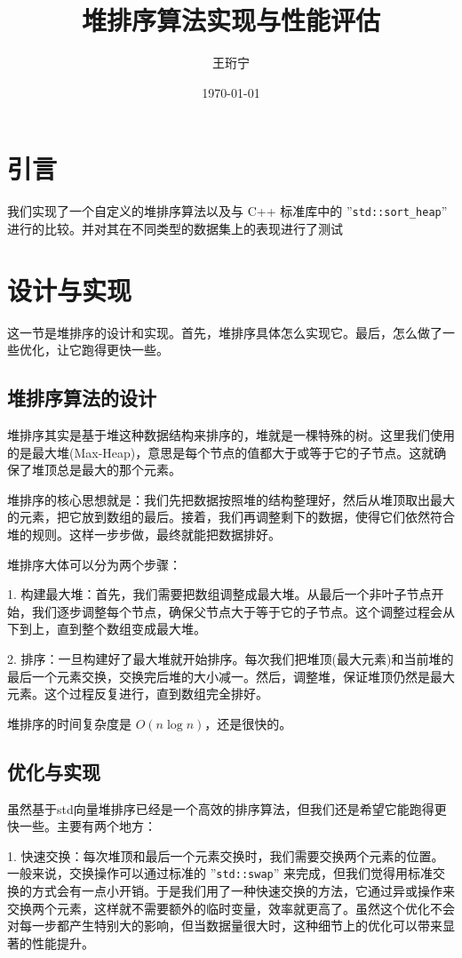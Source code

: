 \documentclass{article}
\title{堆排序算法实现与性能评估}
\author{王珩宁}
\date{\today}
\begin{document}
\maketitle

\section{引言}
我们实现了一个自定义的堆排序算法以及与 C++ 标准库中的 ''\texttt{std::sort\_heap}'' 进行的比较。并对其在不同类型的数据集上的表现进行了测试

\section{设计与实现}
这一节是堆排序的设计和实现。首先，堆排序具体怎么实现它。最后，怎么做了一些优化，让它跑得更快一些。

\subsection{堆排序算法的设计}
堆排序其实是基于堆这种数据结构来排序的，堆就是一棵特殊的树。这里我们使用的是最大堆(Max-Heap)，意思是每个节点的值都大于或等于它的子节点。这就确保了堆顶总是最大的那个元素。

堆排序的核心思想就是：我们先把数据按照堆的结构整理好，然后从堆顶取出最大的元素，把它放到数组的最后。接着，我们再调整剩下的数据，使得它们依然符合堆的规则。这样一步步做，最终就能把数据排好。

堆排序大体可以分为两个步骤：

1. 构建最大堆：首先，我们需要把数组调整成最大堆。从最后一个非叶子节点开始，我们逐步调整每个节点，确保父节点大于等于它的子节点。这个调整过程会从下到上，直到整个数组变成最大堆。
   
2. 排序：一旦构建好了最大堆就开始排序。每次我们把堆顶(最大元素)和当前堆的最后一个元素交换，交换完后堆的大小减一。然后，调整堆，保证堆顶仍然是最大元素。这个过程反复进行，直到数组完全排好。

堆排序的时间复杂度是 $O(n \log n)$，还是很快的。

\subsection{优化与实现}
虽然基于std向量堆排序已经是一个高效的排序算法，但我们还是希望它能跑得更快一些。主要有两个地方：

1. 快速交换：每次堆顶和最后一个元素交换时，我们需要交换两个元素的位置。一般来说，交换操作可以通过标准的 ''\texttt{std::swap}'' 来完成，但我们觉得用标准交换的方式会有一点小开销。于是我们用了一种快速交换的方法，它通过异或操作来交换两个元素，这样就不需要额外的临时变量，效率就更高了。虽然这个优化不会对每一步都产生特别大的影响，但当数据量很大时，这种细节上的优化可以带来显著的性能提升。
\end{document}
